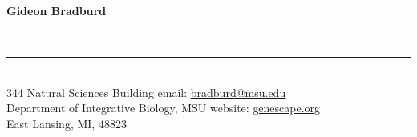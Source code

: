 \documentclass{article}
\begin{document}
%
\begin{huge}
\bf{Gideon Bradburd}\
\end{huge}
\vspace{-0.25cm}
\\
%
\vspace{-0.7cm}
\rule{470pt}{0.4pt}
\vspace{0.3cm}
%
\\
344 Natural Sciences Building \hfill email: \href{mailto:bradburd@msu.edu}{bradburd@msu.edu}\\
Department of Integrative Biology, MSU \hfill website: \href{http://genescape.org}{genescape.org}\\
East Lansing, MI, 48823 \hfill \\
\end{document}
